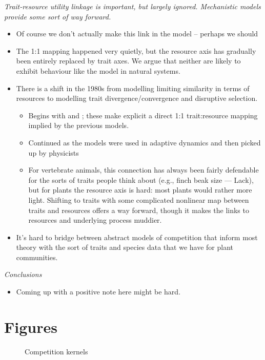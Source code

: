 \documentclass[a4paper,11pt]{article}
\begin{document}
\textit{Trait-resource utility linkage is important, but largely
  ignored.  Mechanistic models provide some sort of way forward.}
\begin{itemize}
\item Of course we don't actually make this link in the model --
  perhaps we should
\item The 1:1 mapping happened very quietly, but the resource axis has
  gradually been entirely replaced by trait axes.  We argue that
  neither are likely to exhibit behaviour like the
  \citet{MacArthur-1967} model in natural systems.
\item There is a shift in the 1980s from modelling limiting
  similarity in terms of resources to modelling trait
  divergence/convergence and disruptive selection.
  \begin{itemize}
  \item Begins with \citet{Taper-1985} and \citet{Brown-1987-140}; these
    make explicit a direct 1:1 trait:resource mapping implied by the
    previous models.
  \item Continued as the models were used in adaptive dynamics
    \citep[e.g.,][]{Dieckmann-1999} and then picked up by physicists
    \citep[e.g.,][]{Leimar-2013}
  \item For vertebrate animals, this connection has always been fairly
    defendable for the sorts of traits people think about (e.g., finch
    beak size --- Lack), but for plants the resource axis is hard: most
    plants would rather more light.  Shifting to traits with some
    complicated nonlinear map between traits and resources offers a way
    forward, though it makes the links to resources and underlying
    process muddier.
  \end{itemize}
\item It's hard to bridge between abstract models of competition that
  inform most theory with the sort of traits and species data that we
  have for plant communities.
\end{itemize}

\textit{Conclusions}
\begin{itemize}
\item Coming up with a positive note here might be hard.
\end{itemize}

\section{Figures}

\begin{figure}[h]
  \centering
  \caption{Competition kernels}
  \label{fig:competition-kernels}
\end{figure}

\clearpage


\end{document}
